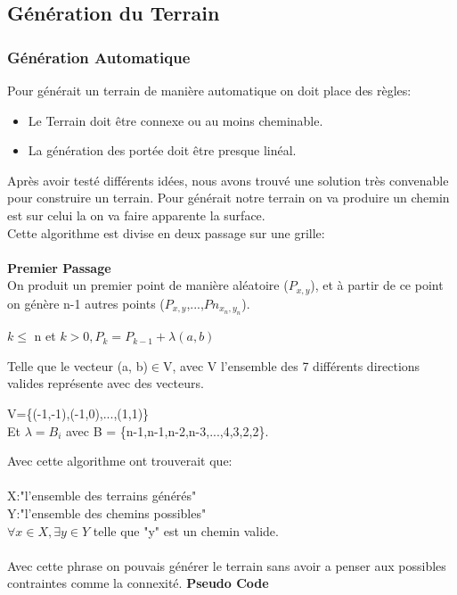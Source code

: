 \documentclass{article}
\begin{document}
\subsection{Génération du Terrain}
\subsubsection{Génération Automatique}
Pour générait un terrain de manière automatique on doit place des règles:
\begin{itemize}
\item Le Terrain doit être connexe ou au moins cheminable.
\item La génération des portée doit être presque linéal.

\end{itemize}
Après avoir testé différents idées, nous avons trouvé une solution très convenable pour construire un terrain. Pour générait notre terrain on va produire un chemin est sur celui la on va faire apparente la surface.\\
Cette algorithme est divise en deux passage sur une grille:\\~\\
\textbf{\Large{Premier Passage}}\\
On produit un premier point de manière aléatoire ($P_{x,y}$), et à partir de ce point on génère n-1 autres points ($P_{x,y}$,...,$Pn_{x_n,y_n}$).
\begin{center}
	$k\leq$ n et $k>0, P_{k} = P_{k-1} + \lambda(a, b)$
\end{center}
Telle que le vecteur (a, b)$\in$V, avec V l'ensemble des 7 différents directions valides représente avec des vecteurs.
\begin{center}
	V=\{(-1,-1),(-1,0),...,(1,1)\}\\
	Et $\lambda = B_i$ avec B = \{n-1,n-1,n-2,n-3,...,4,3,2,2\}.
\end{center}
Avec cette algorithme ont trouverait que:\\~\\
X:"l'ensemble des terrains générés" \\
Y:"l'ensemble des chemins possibles"\\
\(\forall x \in X, \exists y \in Y\) telle que "y" est un chemin valide.\\~\\
Avec cette phrase on pouvais générer le terrain sans avoir a penser aux possibles contraintes comme la connexité.
\newpage
\textbf{\Large{Pseudo Code}}\\~\\
\end{document}
